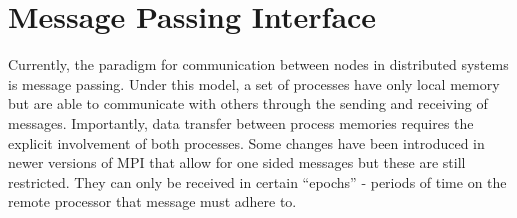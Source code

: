 \section{Message Passing Interface}
Currently, the paradigm for communication between nodes in distributed systems is message passing. Under this model, a set of processes have only local memory but are able to communicate with others through the sending and receiving of messages. Importantly, data transfer between process memories requires the explicit involvement of both processes. Some changes have been introduced in newer versions of MPI that allow for one sided messages but these are still restricted. They can only be received in certain “epochs” - periods of time on the remote processor that message must adhere to.